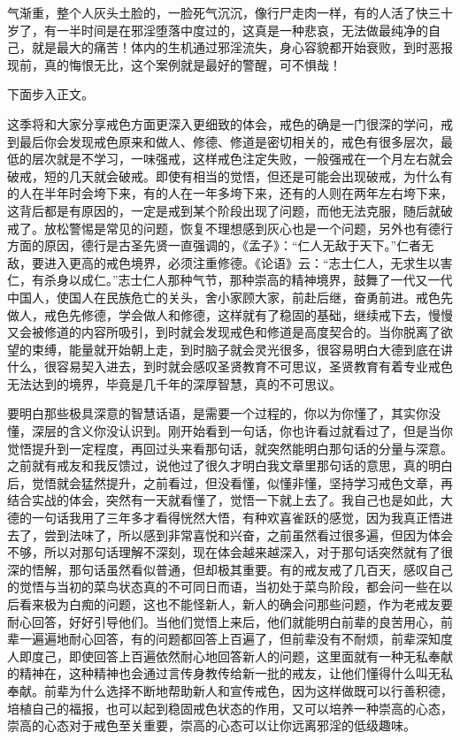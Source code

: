 \begin{case}
气渐重，整个人灰头土脸的，一脸死气沉沉，像行尸走肉一样，有的人活了快三十岁了，有一半时间是在邪淫堕落中度过的，这真是一种悲哀，无法做最纯净的自己，就是最大的痛苦！体内的生机通过邪淫流失，身心容貌都开始衰败，到时恶报现前，真的悔恨无比，这个案例就是最好的警醒，可不惧哉！
\end{case}

下面步入正文。

这季将和大家分享戒色方面更深入更细致的体会，戒色的确是一门很深的学问，戒到最后你会发现戒色原来和做人、修德、修道是密切相关的，戒色有很多层次，最低的层次就是不学习，一味强戒，这样戒色注定失败，一般强戒在一个月左右就会破戒，短的几天就会破戒。即使有相当的觉悟，但还是可能会出现破戒，为什么有的人在半年时会垮下来，有的人在一年多垮下来，还有的人则在两年左右垮下来，这背后都是有原因的，一定是戒到某个阶段出现了问题，而他无法克服，随后就破戒了。放松警惕是常见的问题，恢复不理想感到灰心也是一个问题，另外也有德行方面的原因，德行是古圣先贤一直强调的，《孟子》：“仁人无敌于天下。”仁者无敌，要进入更高的戒色境界，必须注重修德。《论语》云：“志士仁人，无求生以害仁，有杀身以成仁。”志士仁人那种气节，那种崇高的精神境界，鼓舞了一代又一代中国人，使国人在民族危亡的关头，舍小家顾大家，前赴后继，奋勇前进。戒色先做人，戒色先修德，学会做人和修德，这样就有了稳固的基础，继续戒下去，慢慢又会被修道的内容所吸引，到时就会发现戒色和修道是高度契合的。当你脱离了欲望的束缚，能量就开始朝上走，到时脑子就会灵光很多，很容易明白大德到底在讲什么，很容易契入进去，到时就会感叹圣贤教育不可思议，圣贤教育有着专业戒色无法达到的境界，毕竟是几千年的深厚智慧，真的不可思议。

要明白那些极具深意的智慧话语，是需要一个过程的，你以为你懂了，其实你没懂，深层的含义你没认识到。刚开始看到一句话，你也许看过就看过了，但是当你觉悟提升到一定程度，再回过头来看那句话，就突然能明白那句话的分量与深意。之前就有戒友和我反馈过，说他过了很久才明白我文章里那句话的意思，真的明白后，觉悟就会猛然提升，之前看过，但没看懂，似懂非懂，坚持学习戒色文章，再结合实战的体会，突然有一天就看懂了，觉悟一下就上去了。我自己也是如此，大德的一句话我用了三年多才看得恍然大悟，有种欢喜雀跃的感觉，因为我真正悟进去了，尝到法味了，所以感到非常喜悦和兴奋，之前虽然看过很多遍，但因为体会不够，所以对那句话理解不深刻，现在体会越来越深入，对于那句话突然就有了很深的悟解，那句话虽然看似普通，但却极其重要。有的戒友戒了几百天，感叹自己的觉悟与当初的菜鸟状态真的不可同日而语，当初处于菜鸟阶段，都会问一些在以后看来极为白痴的问题，这也不能怪新人，新人的确会问那些问题，作为老戒友要耐心回答，好好引导他们。当他们觉悟上来后，他们就能明白前辈的良苦用心，前辈一遍遍地耐心回答，有的问题都回答上百遍了，但前辈没有不耐烦，前辈深知度人即度己，即使回答上百遍依然耐心地回答新人的问题，这里面就有一种无私奉献的精神在，这种精神也会通过言传身教传给新一批的戒友，让他们懂得什么叫无私奉献。前辈为什么选择不断地帮助新人和宣传戒色，因为这样做既可以行善积德，培植自己的福报，也可以起到稳固戒色状态的作用，又可以培养一种崇高的心态，崇高的心态对于戒色至关重要，崇高的心态可以让你远离邪淫的低级趣味。

